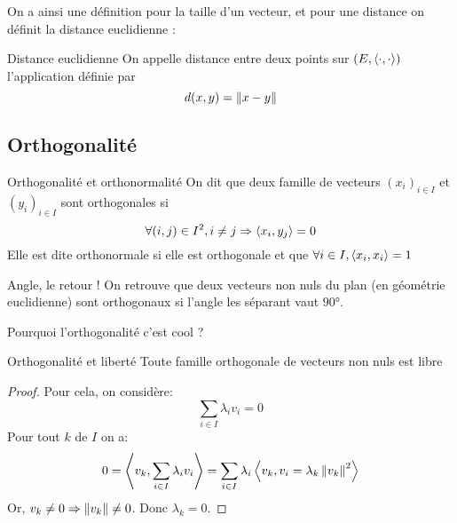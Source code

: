 \documentclass{classe}
\begin{document}
On a ainsi une définition pour la taille d'un vecteur, et pour une distance on définit la distance euclidienne :

\begin{définition}{Distance euclidienne}{}
	On appelle distance entre deux points sur $(E, \left\langle \cdot, \cdot \right\rangle)$ l'application définie par
\begin{equation*}
	d(x, y) = \left\lVert x - y \right\rVert
\end{equation*}
\end{définition}

\subsection{Orthogonalité}

\begin{définition}{Orthogonalité et orthonormalité}{}
On dit que deux famille de vecteurs $(x_i)_{i\in I}$ et $(y_i)_{i\in I}$ sont orthogonales si
\begin{equation*}
	\forall (i, j) \in I^2, i\neq j \Rightarrow \left\langle x_i, y_j \right\rangle = 0
\end{equation*}
Elle est dite orthonormale si elle est orthogonale et que $\forall i \in I, \left\langle x_i, x_i \right\rangle = 1$
\end{définition}

\begin{remarque}{Angle, le retour !}{}
	On retrouve que deux vecteurs non nuls du plan (en géométrie euclidienne) sont orthogonaux si l'angle les séparant vaut $90$°.
\end{remarque}

Pourquoi l'orthogonalité c'est cool ?

\begin{théorème}{Orthogonalité et liberté}{}
Toute famille orthogonale de vecteurs non nuls est libre
\end{théorème}
\begin{proof}
	Pour cela, on considère:
	\begin{equation*}
		\sum_{i\in I}\lambda_{i}v_{i} = 0
	\end{equation*}
	Pour tout $k$ de $I$ on a:
	\begin{equation*}
		0 = \left\langle v_{k}, \sum_{i \in I}\lambda_{i}v_{i} \right\rangle = \sum_{i \in I}\lambda_{i}\left\langle v_{k}, v_{i} = \lambda_{k}\left\lVert v_{k} \right\rVert^{2} \right\rangle
	\end{equation*}
	Or, $v_{k} \neq 0 \Rightarrow \left\lVert v_{k} \right\rVert \neq 0$.
	Donc $\lambda_{k} = 0$.
\end{proof}
\end{document}

